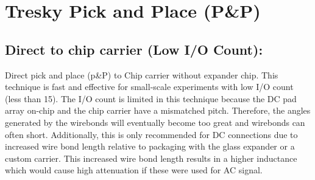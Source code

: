 \section{Tresky Pick and Place (P\&P)}
\subsection{Direct to chip carrier (Low I/O Count):}
\qquad Direct pick and place (p\&P) to Chip carrier without expander chip. This technique is fast and effective for small-scale experiments with low I/O count (less than 15). The I/O count is limited in this technique because the DC pad array on-chip and the chip carrier have a mismatched pitch. Therefore, the angles generated by the wirebonds will eventually become too great and wirebonds can often short. Additionally, this is only recommended for DC connections due to increased wire bond length relative to packaging with the glass expander or a custom carrier. This increased wire bond length results in a higher inductance which would cause high attenuation if these were used for AC signal. 


